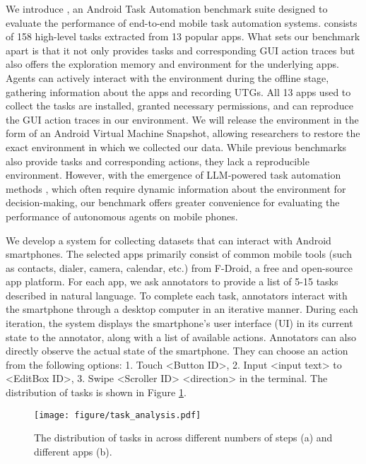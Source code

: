 We introduce \datasetname, an Android Task Automation benchmark suite designed to evaluate the performance of end-to-end mobile task automation systems.
\datasetname consists of 158 high-level tasks extracted from 13 popular apps. What sets our benchmark apart is that it not only provides tasks and corresponding GUI action traces but also offers the exploration memory and environment for the underlying apps. %
Agents can actively interact with the environment during the offline stage, gathering information about the apps and recording UTGs.
All 13 apps used to collect the tasks are installed, granted necessary permissions, and can reproduce the GUI action traces in our environment.
We will release the environment in the form of an Android Virtual Machine Snapshot, allowing researchers to restore the exact environment in which we collected our data.
While previous benchmarks \cite{seq2act, motif, metagui} also provide tasks and corresponding actions, they lack a reproducible environment. However, with the emergence of LLM-powered task automation methods \cite{gorilla, react}, which often require dynamic information about the environment for decision-making, our benchmark offers greater convenience for evaluating the performance of autonomous agents on mobile phones.

We develop a system for collecting datasets that can interact with Android smartphones. The selected apps primarily consist of common mobile tools (such as contacts, dialer, camera, calendar, etc.) from F-Droid, a free and open-source app platform.
For each app, we ask annotators to provide a list of 5-15 tasks described in natural language. To complete each task, annotators interact with the smartphone through a desktop computer in an iterative manner.
During each iteration, the system displays the smartphone's user interface (UI) in its current state to the annotator, along with a list of available actions. Annotators can also directly observe the actual state of the smartphone. They can choose an action from the following options: 1. Touch <Button ID>, 2. Input <input text> to <EditBox ID>, 3. Swipe <Scroller ID> <direction> in the terminal.
The distribution of tasks is shown in Figure \ref{fig:task_destribution}.
\begin{figure}
    \centering
    \texttt{[image: figure/task\_analysis.pdf]}
    \vspace{-0.8cm}
    \caption{The distribution of tasks in \datasetname across different numbers of steps (a) and different apps (b).}
    \label{fig:task_destribution}
    \vspace{-0.4cm}
\end{figure}

